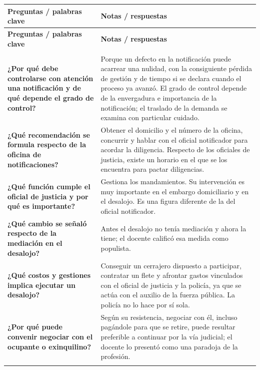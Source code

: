 \documentclass[12pt,oneside]{book}
\newlength{\cornellizq}
\newlength{\cornellder}
\newenvironment{cornell}
{\begin{longtable}{>{\columncolor{gray!10}\raggedright\arraybackslash}p{\cornellizq}>{\raggedright\arraybackslash}p{\cornellder}}
\toprule
\textbf{Preguntas / palabras clave} & \textbf{Notas / respuestas} \\
\midrule
\endfirsthead
\toprule
\textbf{Preguntas / palabras clave} & \textbf{Notas / respuestas} \\
\midrule
\endhead
\midrule
\multicolumn{2}{r}{\footnotesize\itshape Continúa en la página siguiente} \\
\endfoot
\endlastfoot}
{\end{longtable}}
\begin{document}
\begin{cornell}
\textbf{¿Por qué debe controlarse con atención una notificación y de qué depende el grado de control?} &
Porque un defecto en la notificación puede acarrear una nulidad, con la consiguiente pérdida de gestión y de tiempo si se declara cuando el proceso ya avanzó. El grado de control depende de la envergadura e importancia de la notificación; el traslado de la demanda se examina con particular cuidado. \\
\addlinespace
\midrule[0.3pt]
\textbf{¿Qué recomendación se formula respecto de la oficina de notificaciones?} &
Obtener el domicilio y el número de la oficina, concurrir y hablar con el oficial notificador para acordar la diligencia. Respecto de los oficiales de justicia, existe un horario en el que se los encuentra para pactar diligencias. \\
\addlinespace
\midrule[0.3pt]
\textbf{¿Qué función cumple el oficial de justicia y por qué es importante?} &
Gestiona los mandamientos. Su intervención es muy importante en el embargo domiciliario y en el desalojo. Es una figura diferente de la del oficial notificador. \\
\addlinespace
\midrule[0.3pt]
\textbf{¿Qué cambio se señaló respecto de la mediación en el desalojo?} &
Antes el desalojo no tenía mediación y ahora la tiene; el docente calificó esa medida como populista. \\
\addlinespace
\midrule[0.3pt]
\textbf{¿Qué costos y gestiones implica ejecutar un desalojo?} &
Conseguir un cerrajero dispuesto a participar, contratar un flete y afrontar gastos vinculados con el oficial de justicia y la policía, ya que se actúa con el auxilio de la fuerza pública. La policía no lo hace por sí sola. \\
\addlinespace
\midrule[0.3pt]
\textbf{¿Por qué puede convenir negociar con el ocupante o exinquilino?} &
Según su resistencia, negociar con él, incluso pagándole para que se retire, puede resultar preferible a continuar por la vía judicial; el docente lo presentó como una paradoja de la profesión. \\
\addlinespace
\midrule
\rowcolor{blue!5}
\multicolumn{2}{>{\raggedright\arraybackslash}p{\dimexpr\cornellizq+\cornellder+2\tabcolsep\relax}}{%
\textbf{Resumen.} Las notificaciones deben controlarse en proporción a su importancia, con especial cuidado en el traslado de la demanda. El oficial de justicia gestiona los mandamientos y es clave en embargos domiciliarios y desalojos. Ejecutar un desalojo implica costos y gestiones concretas (cerrajero, flete, gastos vinculados con la fuerza pública), y a veces resulta preferible negociar. En la práctica hay aspectos que no están escritos y que el profesional debe averiguar.} \\
\bottomrule
\end{cornell}
\end{document}
